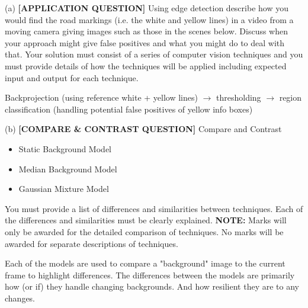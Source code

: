 \begin{tcolorbox}[title=Question]
  (a) \textbf{[APPLICATION QUESTION]} Using edge detection describe how you would find the road markings (i.e. the white and yellow lines) in a video from a moving camera giving images such as those in the scenes below. Discuss when your approach might give false positives and what you might do to deal with that. Your solution must consist of a series of computer vision techniques and you must provide details of how the techniques will be applied including expected input and output for each technique.
  \begin{flushright}
    [25 marks]
  \end{flushright}
\end{tcolorbox}
Backprojection (using reference white + yellow lines) $\rightarrow$ thresholding $\rightarrow$ region classification (handling potential false positives of yellow info boxes)
\begin{tcolorbox}[title=Question]
  (b) \textbf{[COMPARE \& CONTRAST QUESTION]} Compare and Contrast
  \begin{itemize}
    \item Static Background Model
    \item Median Background Model
    \item Gaussian Mixture Model
  \end{itemize}
  You must provide a list of differences and similarities between techniques. Each of the differences and similarities must be clearly explained. \textbf{NOTE:} Marks will only be awarded for the detailed comparison of techniques. No marks will be awarded for separate descriptions of techniques.
  \begin{flushright}
    [25 marks]
  \end{flushright}
\end{tcolorbox}
Each of the models are used to compare a "background" image to the current frame to highlight differences. The differences between the models are primarily how (or if) they handle changing backgrounds. And how resilient they are to any changes. 
